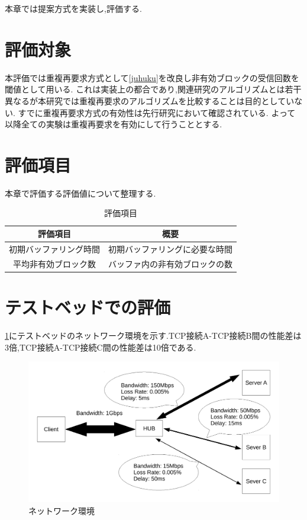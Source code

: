 \documentclass[a4j,12pt]{gradthesis_utf8}
\begin{document}
本章では提案方式を実装し,評価する.

\section{評価対象}
本評価では重複再要求方式として\ref{juhuku}を改良し非有効ブロックの受信回数を閾値として用いる.
これは実装上の都合であり,関連研究のアルゴリズムとは若干異なるが本研究では重複再要求のアルゴリズムを比較することは目的としていない.
すでに重複再要求方式の有効性は先行研究において確認されている.
よって以降全ての実験は重複再要求を有効にして行うこととする.

\section{評価項目}
\label{hyoukakoumoku}
本章で評価する評価値について整理する.
\begin{table}[htb]
	\begin{center}
		\caption{評価項目}
		\begin{tabular}{|c|c|} \hline
			評価項目 & 概要　\\ \hline \hline
			初期バッファリング時間 & 初期バッファリングに必要な時間 \\ \hline
			平均非有効ブロック数 & バッファ内の非有効ブロックの数 \\ \hline
		\end{tabular}
	\end{center}
\end{table}

\newpage

\section{テストベッドでの評価}
\label{testbed}
\ref{networkmodel}にテストベッドのネットワーク環境を示す.TCP接続A-TCP接続B間の性能差は3倍,TCP接続A-TCP接続C間の性能差は10倍である.
\begin{figure}[ht]
	\label{networkmodel}
	\begin{center}
		\includegraphics[width=16cm]{figure/test_network.pdf}
		\caption{ネットワーク環境}
	\end{center}
\end{figure}
\end{document}
